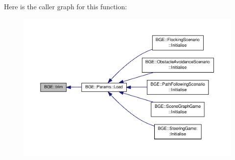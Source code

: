 Here is the caller graph for this function\-:
\nopagebreak
\begin{figure}[H]
\begin{center}
\leavevmode
\includegraphics[width=350pt]{namespace_b_g_e_a65bfe22b3a4b03bf32837ac39a8a6aaf_icgraph}
\end{center}
\end{figure}


